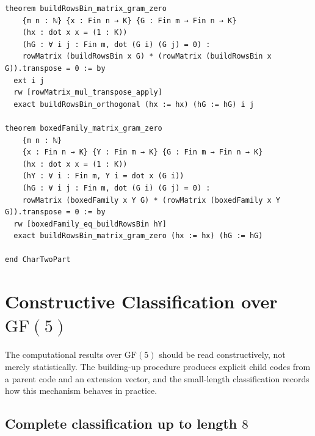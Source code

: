 \documentclass[12pt]{article}
\newcommand{\GF}[1]{\ensuremath{\mathrm{GF}(#1)}}
\begin{document}
\begin{lstlisting}[caption={Lean verification for Theorem~\ref{thm:CZ_Kim_Lagrangian}.}]
theorem buildRowsBin_matrix_gram_zero
    {m n : ℕ} {x : Fin n → K} {G : Fin m → Fin n → K}
    (hx : dot x x = (1 : K))
    (hG : ∀ i j : Fin m, dot (G i) (G j) = 0) :
    rowMatrix (buildRowsBin x G) * (rowMatrix (buildRowsBin x G)).transpose = 0 := by
  ext i j
  rw [rowMatrix_mul_transpose_apply]
  exact buildRowsBin_orthogonal (hx := hx) (hG := hG) i j

theorem boxedFamily_matrix_gram_zero
    {m n : ℕ}
    {x : Fin n → K} {Y : Fin m → K} {G : Fin m → Fin n → K}
    (hx : dot x x = (1 : K))
    (hY : ∀ i : Fin m, Y i = dot x (G i))
    (hG : ∀ i j : Fin m, dot (G i) (G j) = 0) :
    rowMatrix (boxedFamily x Y G) * (rowMatrix (boxedFamily x Y G)).transpose = 0 := by
  rw [boxedFamily_eq_buildRowsBin hY]
  exact buildRowsBin_matrix_gram_zero (hx := hx) (hG := hG)

end CharTwoPart
\end{lstlisting}



\section{Constructive Classification over \texorpdfstring{$\GF{5}$}{GF(5)}}
\label{sec:classification}

The computational results over $\GF{5}$ should be read constructively, not merely statistically. The building-up procedure produces explicit child codes from a parent code and an extension vector, and the small-length classification records how this mechanism behaves in practice.

\subsection{Complete classification up to length $8$}
\end{document}
